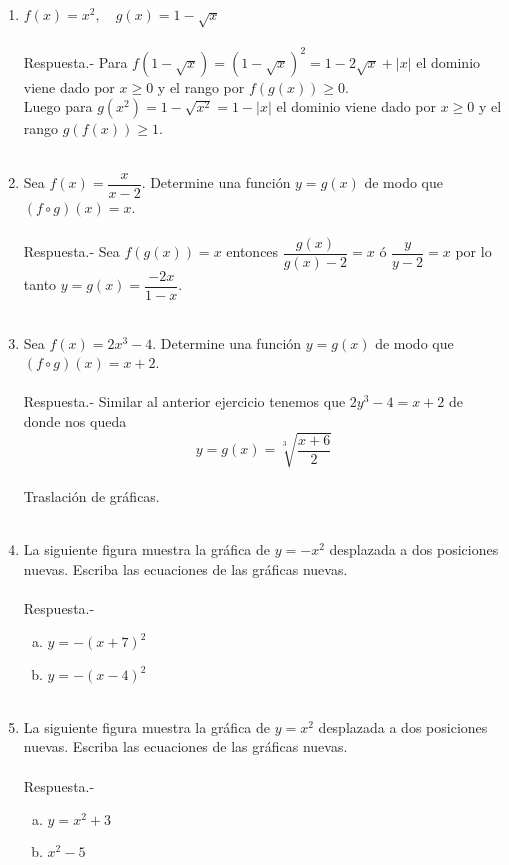 \begin{enumerate}
\item $f(x) = x^2, \quad g(x) = 1 - \sqrt{x}$\\\\
    Respuesta.-\; Para $f(1-\sqrt{x}) = (1-\sqrt{x})^2 = 1 - 2 \sqrt{x} + |x|$ el dominio viene dado por $x\geq 0$ y el rango por $f(g(x)) \geq 0$.\\
    Luego para $g(x^2) = 1 - \sqrt{x^2} = 1 - |x|$ el dominio viene dado por $x\geq 0$ y el rango $g(f(x)) \geq 1$.\\\\

\item Sea $f(x) = \dfrac{x}{x-2}$. Determine una función $y=g(x)$ de modo que $(f\circ g)(x) = x$.\\\\
    Respuesta.-\; Sea $f(g(x))=x$ entonces $\dfrac{g(x)}{g(x)-2} = x$ ó $\dfrac{y}{y-2}=x$ por lo tanto $y=g(x)=\dfrac{-2x}{1-x}$.\\\\ 

\item Sea $f(x)=2x^3 - 4$. Determine una función $y=g(x)$ de modo que $(f\circ g)(x)=x+2$.\\\\
    Respuesta.-\; Similar al anterior ejercicio tenemos que $2y^3 - 4 = x+2$ de donde nos queda $$y=g(x)=\sqrt[3]{\dfrac{x+6}{2}}$$\\

Traslación de gráficas.\\\\

\item La siguiente figura muestra la gráfica de $y=-x^2$ desplazada a dos posiciones nuevas. Escriba las ecuaciones de las gráficas nuevas.\\\\
    Respuesta.-\; 
    \begin{enumerate}[a)]
	\item $y=-(x+7)^2$\\
	\item $y=-(x-4)^2$\\\\
    \end{enumerate}

\item La siguiente figura muestra la gráfica de $y=x^2$ desplazada a dos posiciones nuevas. Escriba las ecuaciones de las gráficas nuevas.\\\\
    Respuesta.-\; 
    \begin{enumerate}[a)]
	\item $y=x^2 + 3$\\
	\item $x^2 - 5$\\\\
    \end{enumerate}


\end{enumerate}
